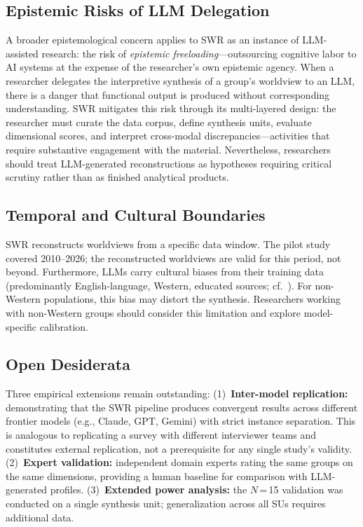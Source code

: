 \documentclass[11pt,a4paper]{article}
\begin{document}
\subsection{Epistemic Risks of LLM Delegation}
\label{sec:limitations:epistemic}

A broader epistemological concern applies to SWR as an instance of LLM-assisted research: the risk of \emph{epistemic freeloading}---outsourcing cognitive labor to AI systems at the expense of the researcher's own epistemic agency. When a researcher delegates the interpretive synthesis of a group's worldview to an LLM, there is a danger that functional output is produced without corresponding understanding. SWR mitigates this risk through its multi-layered design: the researcher must curate the data corpus, define synthesis units, evaluate dimensional scores, and interpret cross-modal discrepancies---activities that require substantive engagement with the material. Nevertheless, researchers should treat LLM-generated reconstructions as hypotheses requiring critical scrutiny rather than as finished analytical products.


\subsection{Temporal and Cultural Boundaries}
\label{sec:limitations:temporal}

SWR reconstructs worldviews from a specific data window. The pilot study covered 2010--2026; the reconstructed worldviews are valid for this period, not beyond. Furthermore, LLMs carry cultural biases from their training data (predominantly English-language, Western, educated sources; cf.~\citealp{Santurkar2023}). For non-Western populations, this bias may distort the synthesis. Researchers working with non-Western groups should consider this limitation and explore model-specific calibration.


\subsection{Open Desiderata}
\label{sec:limitations:desiderata}

Three empirical extensions remain outstanding: (1)~\textbf{Inter-model replication:} demonstrating that the SWR pipeline produces convergent results across different frontier models (e.g., Claude, GPT, Gemini) with strict instance separation. This is analogous to replicating a survey with different interviewer teams and constitutes external replication, not a prerequisite for any single study's validity. (2)~\textbf{Expert validation:} independent domain experts rating the same groups on the same dimensions, providing a human baseline for comparison with LLM-generated profiles. (3)~\textbf{Extended power analysis:} the $N$\,=\,15 validation was conducted on a single synthesis unit; generalization across all SUs requires additional data.
\end{document}
